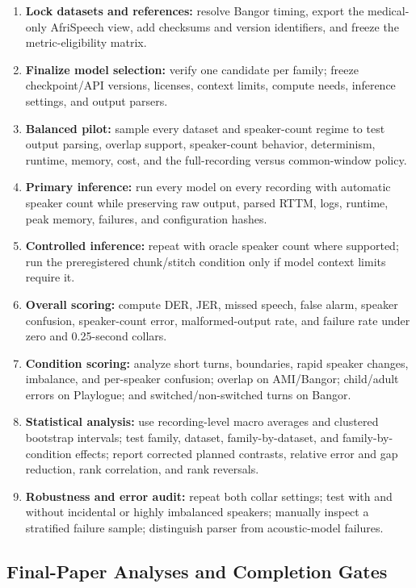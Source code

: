 \documentclass[conference,onecolumn]{IEEEtran}
\begin{document}
\begin{enumerate}
\item \textbf{Lock datasets and references:} resolve Bangor timing, export the
medical-only AfriSpeech view, add checksums and version identifiers, and freeze
the metric-eligibility matrix.
\item \textbf{Finalize model selection:} verify one candidate per family;
freeze checkpoint/API versions, licenses, context limits, compute needs,
inference settings, and output parsers.
\item \textbf{Balanced pilot:} sample every dataset and speaker-count regime to
test output parsing, overlap support, speaker-count behavior, determinism,
runtime, memory, cost, and the full-recording versus common-window policy.
\item \textbf{Primary inference:} run every model on every recording with
automatic speaker count while preserving raw output, parsed RTTM, logs,
runtime, peak memory, failures, and configuration hashes.
\item \textbf{Controlled inference:} repeat with oracle speaker count where
supported; run the preregistered chunk/stitch condition only if model context
limits require it.
\item \textbf{Overall scoring:} compute DER, JER, missed speech, false alarm,
speaker confusion, speaker-count error, malformed-output rate, and failure rate
under zero and 0.25-second collars.
\item \textbf{Condition scoring:} analyze short turns, boundaries, rapid
speaker changes, imbalance, and per-speaker confusion; overlap on AMI/Bangor;
child/adult errors on Playlogue; and switched/non-switched turns on Bangor.
\item \textbf{Statistical analysis:} use recording-level macro averages and
clustered bootstrap intervals; test family, dataset, family-by-dataset, and
family-by-condition effects; report corrected planned contrasts, relative
error and gap reduction, rank correlation, and rank reversals.
\item \textbf{Robustness and error audit:} repeat both collar settings; test
with and without incidental or highly imbalanced speakers; manually inspect a
stratified failure sample; distinguish parser from acoustic-model failures.
\end{enumerate}

\subsection{Final-Paper Analyses and Completion Gates}
\end{document}
